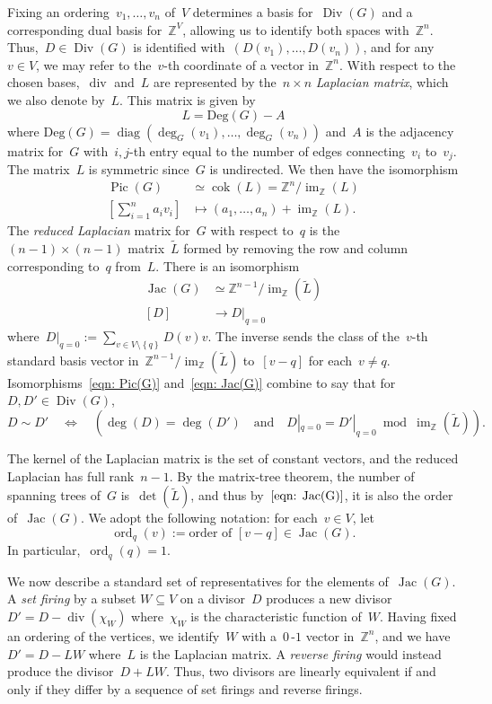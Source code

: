 \documentclass{amsart}
\DeclareMathOperator{\Pic}{Pic}
\DeclareMathOperator{\Jac}{Jac}
\DeclareMathOperator{\Div}{Div}
\DeclareMathOperator{\smalldiv}{div}
\DeclareMathOperator{\diag}{diag}
\DeclareMathOperator{\im}{im}
\DeclareMathOperator{\cok}{cok}
\DeclareMathOperator{\ord}{ord}
\newcommand{\Z}{\mathbb{Z}}
\newcommand{\tL}{\tilde{L}}
\begin{document}
Fixing an ordering~$v_1,\dots,v_n$ of~$V$ determines a
basis for~$\Div(G)$ and a corresponding dual basis for~$\Z^V$, allowing us to
identify both spaces with~$\Z^n$.  Thus,~$D\in\Div(G)$ is identified
with~$(D(v_1),\dots,D(v_n))$, and for any~$v\in V$, we may refer to the~$v$-th
coordinate of a vector in~$\Z^n$.  With respect to the chosen bases,~$\smalldiv$
and~$L$ are represented by the~$n\times n$ {\em Laplacian matrix}, which we also
denote by~$L$.  This matrix is given by
\[
  L=\mathrm{Deg}(G)-A
\]
where $\mathrm{Deg}(G)=\diag(\deg_G(v_1),\dots,\deg_G(v_n))$
and~$A$ is the adjacency matrix for~$G$ with~$i,j$-th entry
equal to the number of edges connecting~$v_i$ to~$v_j$. The matrix~$L$ is symmetric
since~$G$ is undirected.  We then have the
isomorphism
\begin{align*}
  \Pic(G)&\simeq \cok(L)=\Z^n/\im_{\Z}(L)\\
  \textstyle [\sum_{i=1}^{n}a_iv_i]&\mapsto(a_1,\dots,a_n)+\im_{\Z}(L).
\end{align*}
The {\em reduced Laplacian} matrix for~$G$ with
respect to~$q$ is the~$(n-1)\times(n-1)$ matrix~$\tL$ formed by removing the row
and column corresponding to~$q$ from~$L$.  There is an isomorphism
\begin{align}\label{eqn: Jac(G)}
  \Jac(G)&\simeq\Z^{n-1}/\im_{\Z}(\tL)\\
  [D]&\to D|_{q=0}\nonumber
\end{align}
where~$D|_{q=0}:=\sum_{v\in V\setminus\left\{ q \right\}}D(v)v$.  The inverse
sends the class of the~$v$-th standard basis vector
in~$\Z^{n-1}/\im_{\Z}(\tL)$ to~$[v-q]$ for each~$v\neq q$.
Isomorphisms~\ref{eqn: Pic(G)} and~\ref{eqn: Jac(G)} combine to say
that for~$D,D'\in\Div(G)$,
\[
  D\sim D'
  \quad\Longleftrightarrow\quad 
  \left(
  \deg(D)=\deg(D')
  \quad\text{and}\quad
  D|_{q=0}=D'|_{q=0}\bmod\im_{\Z}(\tL)\right).
\]

The kernel of the Laplacian matrix is the set of constant vectors, and the
reduced Laplacian has full rank~$n-1$.  By the matrix-tree
theorem, the number of spanning trees of~$G$ is~$\det(\tL)$, and thus
by~$\eqref{eqn: Jac(G)}$, it is also the order of~$\Jac(G)$.  We adopt the
following notation: for each~$v\in V$, let
\[
\ord_q(v):= \text{order of~$[v-q]\in\Jac(G)$}.
\]
In particular,~$\ord_q(q)=1$.

We now describe a standard set of representatives for the elements of~$\Jac(G)$.
A {\em set firing} by a subset $W\subseteq V$ on a divisor~$D$ produces a new
divisor~$D'=D-\smalldiv(\chi_W)$ where~$\chi_W$ is the characteristic function
of~$W$.  Having fixed an ordering of the vertices, we identify~$W$ with
a~$0$\,-$1$ vector in~$\Z^n$, and we have~$D'=D-LW$ where~$L$ is the Laplacian matrix.  
A {\em reverse firing} would instead produce the divisor~$D+LW$.  Thus, two
divisors are linearly equivalent if and only if they differ by a sequence of set
firings and reverse firings.
\end{document}
